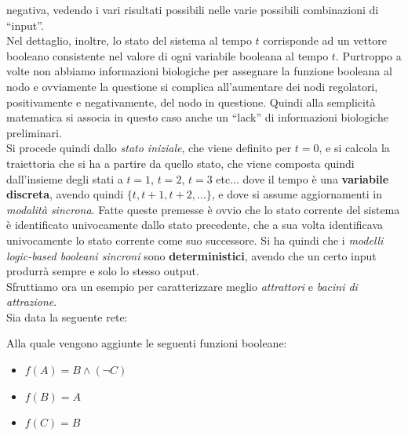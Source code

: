 \documentclass[a4paper,12pt, oneside]{book}
\begin{document}
negativa, vedendo i vari risultati possibili nelle varie possibili combinazioni
di ``input''.\\
Nel dettaglio, inoltre, lo stato del sistema al tempo $t$ corrisponde ad un
vettore booleano consistente nel valore di ogni variabile booleana al tempo
$t$. Purtroppo a volte non abbiamo informazioni biologiche per assegnare la
funzione booleana al nodo e ovviamente la questione si complica all'aumentare
dei nodi regolatori, positivamente e negativamente, del nodo in
questione. Quindi alla semplicità matematica si associa in questo caso anche un
``lack'' di informazioni biologiche preliminari. \\
Si procede quindi dallo \textit{stato iniziale}, che viene definito per $t=0$, e
si calcola la traiettoria che si ha a partire da quello stato, che viene
composta quindi dall'insieme degli stati a $t=1$, $t=2$, $t=3$ etc$\ldots$ dove
il tempo è una \textbf{variabile discreta}, avendo quindi $\{t,
t+1,t+2,\ldots\}$, e dove si assume aggiornamenti in \textit{modalità sincrona}.
Fatte queste premesse è ovvio che lo stato corrente del sistema è identificato
univocamente dallo stato precedente, che a sua volta identificava univocamente
lo stato corrente come suo successore. Si ha quindi che i \textit{modelli
  logic-based booleani sincroni} sono \textbf{deterministici}, avendo che un
certo input produrrà sempre e solo lo stesso output.\\
Sfruttiamo ora un esempio per caratterizzare meglio \textit{attrattori} e
\textit{bacini di attrazione}.\\
Sia data la seguente rete:
\begin{center}
\end{center}
\newpage
\noindent
Alla quale vengono aggiunte le seguenti funzioni booleane:
\begin{itemize}
  \item $f(A)=B\land (\neg C)$
  \item $f(B)=A$
  \item $f(C)=B$
\end{itemize}
\end{document}
